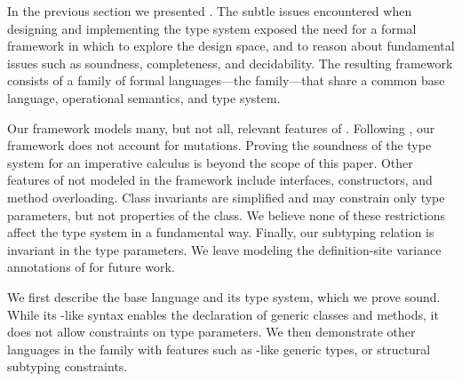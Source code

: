 \newcommand\comma{,~}
\newcommand\tj[2]{{#1} \vdash_{\cal T}{#2}}
\newcommand\cj[2]{{#1} \vdash_{\cal C}{#2}}
\newcommand\wj[2]{{#1} \vdash_{\cal W}{#2}}
\newcommand\cdecl{{\tt class}~{\tt C}[\tbar{X}]\{{\tt c}\}(\tbar{f}\ty\tbar{F})~{\tt extends}~{\tt D}[\tbar{E}]~\{~\tbar{M}~\}}
\newcommand\msign[5]{{\tt m}[\tbar{#1}](\tbar{#2}\ty\tbar{#3})\{{\tt #4}\}\ty{\tt #5}}
\newcommand\minst[6]{\msign{#1}{#2}{#3}{#4}{#5}={\tt #6}}
\newcommand\mdecl[6]{{\tt def}~\minst{#1}{#2}{#3}{#4}{#5}{#6}}
\newcommand{\vdashQ}{\vdash_{\cal X}}
\newcommand{\vdashS}{\vdash_{\cal X}}
\newcommand{\Dom}{{\sf Dom}}
\newcommand{\Img}{{\sf Rng}}

In the previous section we presented \Xten. The subtle issues encountered when designing and implementing the \Xten type system exposed the need for a formal framework in which to explore the design space, and to reason about fundamental issues such as soundness, completeness, and decidability. The resulting framework consists of a family of formal languages---the \FXG family---that share a common base language, operational semantics, and type system.

Our framework models many, but not all, relevant features of \Xten.
Following \FJ, our framework does not account for mutations. Proving the soundness of the type system for an imperative calculus is beyond the scope of this paper.
Other features of \Xten not modeled in the framework include interfaces, constructors, and method overloading. Class invariants are simplified and may constrain only type parameters, but not properties of the class.  We believe none of these restrictions affect the type system in a fundamental way. Finally, our subtyping relation is invariant in the type parameters. We leave modeling the definition-site variance annotations of \Xten for future work.

We first describe the base \FXG language and its type system, which we prove sound. While its \FGJ-like syntax enables the declaration of generic classes and methods, it does not allow constraints on type parameters. We then demonstrate other languages in the family with features such as \FGJ-like generic types, or structural subtyping constraints.

